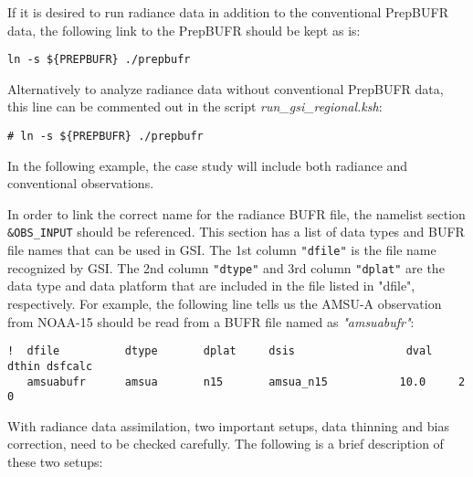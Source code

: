 If it is desired to run radiance data in addition to the conventional PrepBUFR data, the following link to the PrepBUFR should be kept as is:

\begin{scriptsize}
\begin{verbatim}
ln -s ${PREPBUFR} ./prepbufr
\end{verbatim}
\end{scriptsize}

Alternatively to analyze radiance data without conventional PrepBUFR data, this line can be commented out in the script \textit{run\_gsi\_regional.ksh}:

\begin{scriptsize}
\begin{verbatim}
# ln -s ${PREPBUFR} ./prepbufr
\end{verbatim}
\end{scriptsize}

In the following example, the case study will include both radiance and conventional observations.  

In order to link the correct name for the radiance BUFR file, the namelist section \verb|&OBS_INPUT| should be referenced.  This section has a list of data types and BUFR file names that can be used in GSI.  The 1st column \verb|"dfile"| is the file name recognized by GSI.  The 2nd column \verb|"dtype"| and 3rd column \verb|"dplat"| are the data type and data platform that are included in the file listed in "dfile", respectively. For example, the following line tells us the AMSU-A observation from NOAA-15 should be read from a BUFR file named as \textit{"amsuabufr"}:

\begin{scriptsize}
\begin{verbatim}
!  dfile          dtype       dplat     dsis                 dval    dthin dsfcalc
   amsuabufr      amsua       n15       amsua_n15           10.0     2     0
\end{verbatim}
\end{scriptsize}

With radiance data assimilation, two important setups, data thinning and bias correction, need to be checked carefully. The following is a brief description of these two setups:

